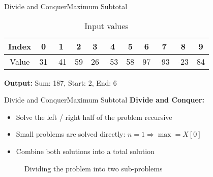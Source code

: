 
\begin{frame}{Divide and Conquer}{Maximum Subtotal}
  \begin{example}
    \vspace{-1em}
    \begin{table}[!t]
      \caption{Input values}
      \begin{tabular}{c|c|c|c|c|c|c|c|c|c|c}
        Index & 0 & 1 & 2 & 3 & 4 & 5 & 6 & 7 & 8 & 9\\
        \midrule
        Value & 31 & -41 & 59 & 26 & -53 & 58 & 97 & -93 & -23 & 84
      \end{tabular}
      \label{tab:divide_and_conquer:max_subtotal_example_values}
    \end{table}
    \vspace{6em}
    \textbf{Output:} Sum: 187, Start: 2, End: 6
  \end{example}
\end{frame}


\begin{frame}{Divide and Conquer}{Maximum Subtotal}
  \textbf{Divide and Conquer:}
  \begin{itemize}
    \item
      Solve the left / right half of the problem {\color{Mittel-Blau}recursive}
    \item
      Small problems are solved directly: $n = 1 \Rightarrow \max = X[0]$
    \item
      Combine both solutions into a total solution
  \end{itemize}
  \begin{figure}
    \begin{adjustbox}{width=\linewidth}
      
    \end{adjustbox}
    \caption{Dividing the problem into two sub-problems}
    \label{fig:divide_and_conquer:max_sub_total_divide}
  \end{figure}
\end{frame}


